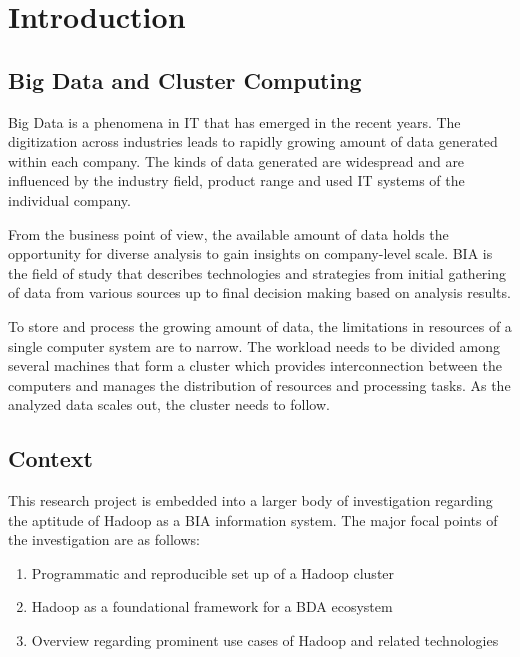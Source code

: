 \chapter{Introduction}
\label{chap:intro}

\section{Big Data and Cluster Computing}
\label{sec:intro:cluster}

Big Data is a phenomena in \ac{IT} that has emerged in the recent years.
The digitization across industries leads to rapidly growing amount of data generated
within each company.
The kinds of data generated are widespread 
and are influenced by the industry field, product range and used \ac{IT} systems 
of the individual company.

From the business point of view, the available amount of data 
holds the opportunity for diverse analysis to gain insights on company-level scale.
\ac{BIA} is the field of study that describes technologies and strategies 
from initial gathering of data from various sources 
up to final decision making based on analysis results.    

To store and process the growing amount of data, 
the limitations in resources of a single computer system are to narrow.
The workload needs to be divided among several machines that form a cluster 
which provides interconnection between the computers 
and manages the distribution of resources and processing tasks.
As the analyzed data scales out, the cluster needs to follow.

\section{Context}
\label{sec:intro:context}

This research project is embedded into a larger body of investigation regarding the aptitude of Hadoop as a \acs{BIA} information system. The major focal points of the investigation are as follows:

\begin{enumerate}
	\item Programmatic and reproducible set up of a Hadoop cluster
	\item Hadoop as a foundational framework for a \acl{BDA} ecosystem
	\item Overview regarding prominent use cases of Hadoop and related technologies
\end{enumerate}

